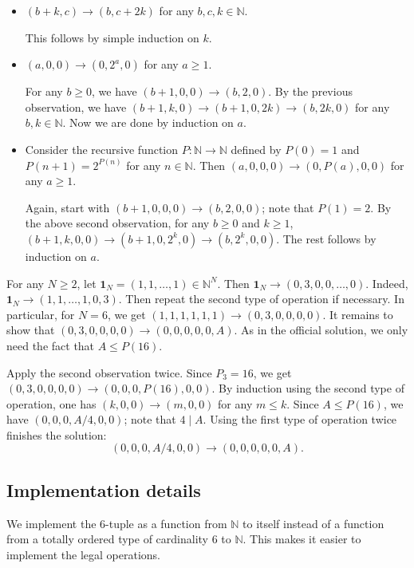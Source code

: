 \documentclass{article}
\newcommand{\N}{\mathbb{N}}
\begin{document}
\begin{itemize}

    \item
    $(b + k, c) \to (b, c + 2k)$ for any $b, c, k \in \N$.

    This follows by simple induction on $k$.

    \item
    $(a, 0, 0) \to (0, 2^a, 0)$ for any $a \geq 1$.

    For any $b \geq 0$, we have $(b + 1, 0, 0) \to (b, 2, 0)$.
    By the previous observation, we have $(b + 1, k, 0) \to (b + 1, 0, 2k) \to (b, 2k, 0)$ for any $b, k \in \N$.
    Now we are done by induction on $a$.

    \item
    Consider the recursive function $P : \N \to \N$ defined by $P(0) = 1$ and $P(n + 1) = 2^{P(n)}$ for any $n \in \N$.
    Then $(a, 0, 0, 0) \to (0, P(a), 0, 0)$ for any $a \geq 1$.

    Again, start with $(b + 1, 0, 0, 0) \to (b, 2, 0, 0)$; note that $P(1) = 2$.
    By the above second observation, for any $b \geq 0$ and $k \geq 1$, $(b + 1, k, 0, 0) \to (b + 1, 0, 2^k, 0) \to (b, 2^k, 0, 0)$.
    The rest follows by induction on $a$.

\end{itemize}

For any $N \geq 2$, let $\mathbf{1}_N = (1, 1, \ldots, 1) \in \N^N$.
Then $\mathbf{1}_N \to (0, 3, 0, 0, \ldots, 0)$.
Indeed, $\mathbf{1}_N \to (1, 1, \ldots, 1, 0, 3)$.
Then repeat the second type of operation if necessary.
In particular, for $N = 6$, we get $(1, 1, 1, 1, 1, 1) \to (0, 3, 0, 0, 0, 0)$.
It remains to show that $(0, 3, 0, 0, 0, 0) \to (0, 0, 0, 0, 0, A)$.
As in the official solution, we only need the fact that $A \leq P(16)$.

Apply the second observation twice.
Since $P_3 = 16$, we get $(0, 3, 0, 0, 0, 0) \to (0, 0, 0, P(16), 0, 0)$.
By induction using the second type of operation, one has $(k, 0, 0) \to (m, 0, 0)$ for any $m \leq k$.
Since $A \leq P(16)$, we have $(0, 0, 0, A/4, 0, 0)$; note that $4 \mid A$.
Using the first type of operation twice finishes the solution:
\[ (0, 0, 0, A/4, 0, 0) \to (0, 0, 0, 0, 0, A). \]



\subsection*{Implementation details}

We implement the $6$-tuple as a function from $\N$ to itself instead of a function from a totally ordered type of cardinality $6$ to $\N$.
This makes it easier to implement the legal operations.
\end{document}
